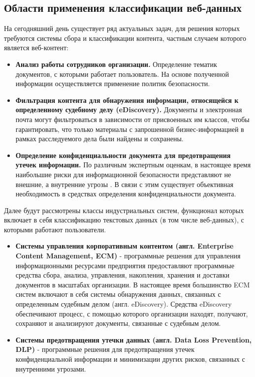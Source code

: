 \documentclass[russian, utf8, emptystyle]{eskdtext}
\begin{document}
\subsection {Области применения классификации веб-данных}
На сегодняшний день существует ряд актуальных задач, для решения которых требуются системы сбора и классификации контента, частным случаем которого является веб-контент:
\begin{itemize}
	\item {\bf Анализ работы сотрудников организации.}
	Определение тематик документов, с которыми работает пользователь. На основе полученной информации осуществляется применение политик безопасности.
	\item {\bf Фильтрация контента для обнаружения информации, относящейся к определенному судебному делу (eDiscovery\cite{eDiscovery}).}
	Документы и электронная почта могут фильтроваться в зависимости от присвоенных им классов, чтобы гарантировать, что только материалы с запрошенной бизнес-информацией в рамках расследуемого дела были найдены и сохранены.
	\item {\bf Определение конфиденциальности документа для предотвращения утечек информации.}
	По различным экспертным оценкам, в настоящее время наибольшие риски для информационной безопасности представляют не внешние, а внутренние угрозы \cite{InfoWatch}.
	В связи с этим существует объективная необходимость в средствах определения конфиденциальности документа.
	
\end{itemize}

Далее будут рассмотрены классы индустриальных систем, функционал которых включает в себя классификацию текстовых данных (в том числе веб-данных), с которыми работают пользователи.
\begin{itemize}
	\item {\bf 	Системы управления корпоративным контентом (англ. Enterprise Content Management, ECM) } - программные решения для управления информационными ресурсами предприятия предоставляют программные средства сбора, анализа, управления, накопления, хранения и доставки документов в масштабах организации. В настоящее время большинство ECM систем включают в себя системы обнаружения данных, связанных с определенным судебным делом (англ. eDiscovery). Средства eDiscovery обеспечивают процесс, с помощью которого организации находят, получают, сохраняют и анализируют документы, связанные с судебным делом.
	\item {\bf Системы предотвращения утечки данных (англ. Data Loss Prevention, DLP)} -
	программные решения для предотвращения утечек конфиденциальной информации и минимизации других рисков, связанных с внутренними угрозами.
\end{itemize}
\end{document}

